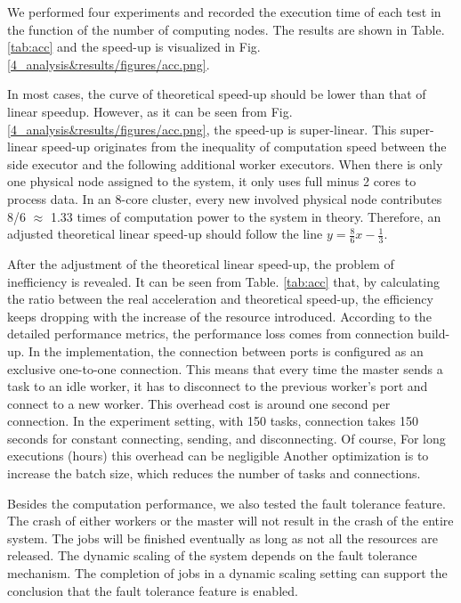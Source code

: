 We performed four experiments and recorded the execution time of each test in the function of the number of computing nodes.
 The results are shown in Table.  \ref{tab:acc} and the speed-up is visualized in Fig.\ref{4_analysis&results/figures/acc.png}.

In most cases, the curve of theoretical speed-up should be lower than that of linear speedup.
However, as it can be seen from Fig. \ref{4_analysis&results/figures/acc.png}, the speed-up is super-linear.
This super-linear speed-up originates from the inequality of computation speed between the side executor and the following additional worker executors.
When there is only one physical node assigned to the system, it only uses full minus 2 cores to process data.
In an 8-core cluster, every new involved physical node contributes 8/6 $\approx$ 1.33 times of computation power to the system in theory.
Therefore, an adjusted theoretical linear speed-up should follow the line  $y=\frac{8}{6}x-\frac{1}{3}$.

After the adjustment of the theoretical linear speed-up, the problem of inefficiency is revealed.
It can be seen from Table. \ref{tab:acc} that, by calculating the ratio between the real acceleration and theoretical speed-up, the efficiency keeps dropping with the increase of the resource introduced.
According to the detailed performance metrics, the performance loss comes from connection build-up. 
In the implementation, the connection between ports is configured as an exclusive one-to-one connection.
This means that every time the master sends a task to an idle worker, it has to disconnect to the previous worker’s port and connect to a new worker.
This overhead cost is around one second per connection.
In the experiment setting, with 150 tasks, connection takes 150 seconds for constant connecting, sending, and disconnecting.
Of course, For long executions (hours) this overhead can be negligible 
Another optimization is to increase the batch size, which reduces the number of tasks and connections.


Besides the computation performance, we also tested the fault tolerance feature.
The crash of either workers or the master will not result in the crash of the entire system.
The jobs will be finished eventually as long as not all the resources are released.
The dynamic scaling of the system depends on the fault tolerance mechanism.
The completion of jobs in a dynamic scaling setting can support the conclusion that the fault tolerance feature is enabled.

